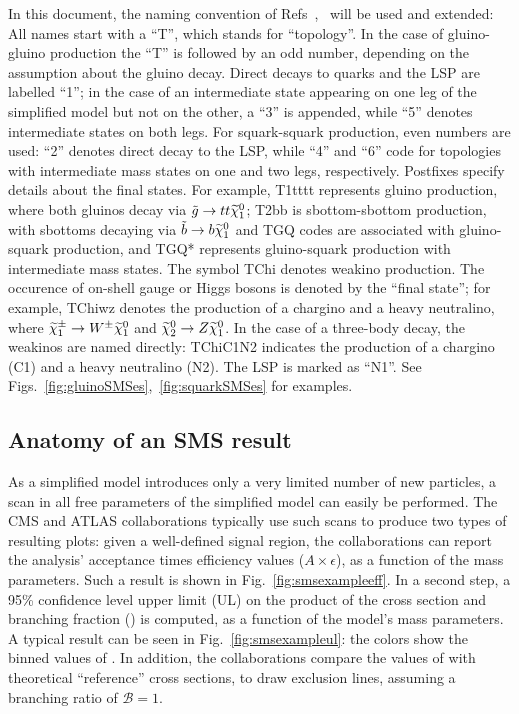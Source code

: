 \label{ssec:names}
In this document, the naming convention of Refs~\cite{SUS11016},~\cite{cms:2013wc}
will be used and extended:
All names start with a ``T'', which stands for ``topology''.  In the case of
gluino-gluino production the ``T'' is followed by an odd number,
depending on the assumption about the gluino decay. Direct decays to quarks and
the LSP are labelled ``1''; in the case of an intermediate state appearing on
one leg of the simplified model but not on the other, a ``3'' is appended,
while ``5'' denotes intermediate states on both legs. For squark-squark
production, even numbers are used: ``2'' denotes direct decay to the LSP, while
``4'' and ``6'' code for topologies with intermediate mass states on one and
two legs, respectively.  Postfixes specify details about the final states. For
example,  T1tttt represents gluino production, where both gluinos decay via
$\tilde{g} \rightarrow t t \widetilde{\chi}^0_1$; T2bb is sbottom-sbottom production, with sbottoms
decaying via $\tilde{b} \rightarrow b \widetilde{\chi}^0_1$ and TGQ codes are associated with
gluino-squark production, and TGQ* represents gluino-squark production with
intermediate mass states.  The symbol TChi denotes weakino production. The
occurence of on-shell gauge or Higgs bosons
is denoted by the ``final state''; for example,  TChiwz denotes the production
of a chargino and a heavy neutralino, where $\widetilde{\chi}^\pm_1 \rightarrow W^\pm \widetilde{\chi}^0_1$
and $\widetilde{\chi}^0_2 \rightarrow Z \widetilde{\chi}^0_1$. In the case of a three-body decay, the
weakinos are named directly: TChiC1N2 indicates the production of a chargino
(C1) and a heavy neutralino (N2).
The LSP is marked as ``N1''. See
Figs.~\ref{fig:gluinoSMSes},~\ref{fig:squarkSMSes} for examples.

\subsection{Anatomy of an SMS result}
\label{ssec:smsstatistics}
As a simplified model introduces only a very limited number of new particles,
a scan in all free parameters of the simplified model can easily be performed.
The CMS and ATLAS collaborations typically use such scans to produce two types
of resulting plots: given a well-defined signal region, the collaborations
can report the analysis' acceptance times efficiency values ($A \times
\epsilon$), as a function of the mass parameters. Such a result is shown in
Fig.~\ref{fig:smsexampleeff}. 
In a second step, a 95\% confidence level upper limit (UL) on the product of
the cross section and branching fraction (\sigmaXBF) is computed, as a function
of the model's mass parameters. A typical result can be seen in
Fig.~\ref{fig:smsexampleul}: the colors show the binned values of \sigmaXBF.
In addition, the collaborations compare the values of \sigmaXBF with
theoretical ``reference'' cross sections, to draw exclusion lines, assuming a
branching ratio of $\mathcal{B}=1$. 

